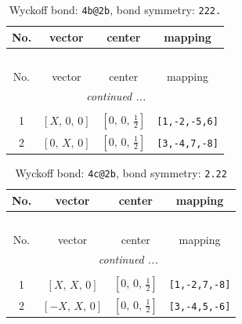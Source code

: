 \documentclass[fleqn,8pt]{jsarticle}
\begin{document}
\renewcommand{\arraystretch}{1.2}
\begin{longtable}{cccc}
\caption{Wyckoff bond: {\tt 4b@2b}, bond symmetry: {\tt 222.}}
 \\
 \hline \hline
No. & vector & center & mapping \\ \hline \endfirsthead

\multicolumn{3}{l}{\tablename\ \thetable{}} \\
 \hline \hline
No. & vector & center & mapping \\ \hline \endhead

 \hline \hline
\multicolumn{3}{r}{\footnotesize\it continued ...} \\ \endfoot

 \hline \hline
\multicolumn{3}{r}{} \\ \endlastfoot

1 & $\left[ X,\, 0,\, 0 \right]$ & $\left[ 0,\, 0,\, \frac{1}{2} \right]$ & {\tt [1,-2,-5,6]} \\ \hline
2 & $\left[ 0,\, X,\, 0 \right]$ & $\left[ 0,\, 0,\, \frac{1}{2} \right]$ & {\tt [3,-4,7,-8]} \\
\end{longtable}
\renewcommand{\arraystretch}{1.2}
\begin{longtable}{cccc}
\caption{Wyckoff bond: {\tt 4c@2b}, bond symmetry: {\tt 2.22}}
 \\
 \hline \hline
No. & vector & center & mapping \\ \hline \endfirsthead

\multicolumn{3}{l}{\tablename\ \thetable{}} \\
 \hline \hline
No. & vector & center & mapping \\ \hline \endhead

 \hline \hline
\multicolumn{3}{r}{\footnotesize\it continued ...} \\ \endfoot

 \hline \hline
\multicolumn{3}{r}{} \\ \endlastfoot

1 & $\left[ X,\, X,\, 0 \right]$ & $\left[ 0,\, 0,\, \frac{1}{2} \right]$ & {\tt [1,-2,7,-8]} \\ \hline
2 & $\left[ - X,\, X,\, 0 \right]$ & $\left[ 0,\, 0,\, \frac{1}{2} \right]$ & {\tt [3,-4,5,-6]} \\
\end{longtable}
\renewcommand{\arraystretch}{1.2}
\end{document}
